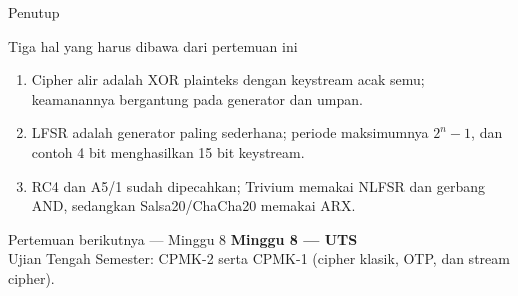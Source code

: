 \documentclass[aspectratio=169,11pt]{beamer}
\begin{document}
\begin{frame}{Penutup}
    \begin{block}{Tiga hal yang harus dibawa dari pertemuan ini}
        \begin{enumerate}
            \item Cipher alir adalah XOR plainteks dengan keystream acak
                  semu; keamanannya bergantung pada generator dan umpan.
            \item LFSR adalah generator paling sederhana; periode maksimumnya
                  $2^n-1$, dan contoh 4 bit menghasilkan 15 bit keystream.
            \item RC4 dan A5/1 sudah dipecahkan; Trivium memakai NLFSR dan
                  gerbang AND, sedangkan Salsa20/ChaCha20 memakai ARX.
        \end{enumerate}
    \end{block}
    \vspace{0.3cm}
    \begin{exampleblock}{Pertemuan berikutnya --- Minggu 8}
        \textbf{Minggu 8 --- UTS}\\
        Ujian Tengah Semester: CPMK-2 serta CPMK-1 (cipher klasik, OTP,
        dan stream cipher).
    \end{exampleblock}
\end{frame}
\end{document}
